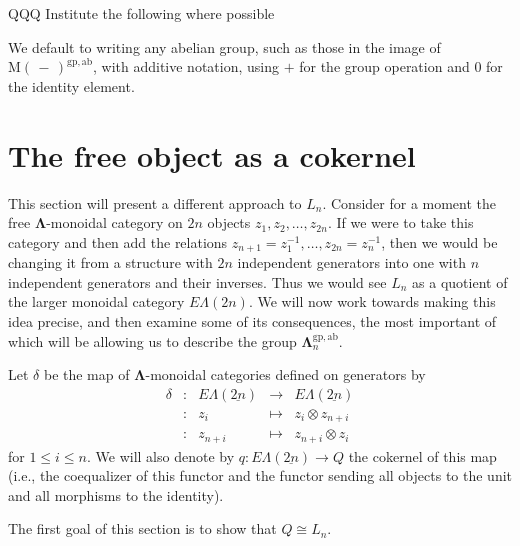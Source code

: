 \documentclass{amsbook} %
\newcommand{\ML}{\mathbf{\Lambda}}
\newcommand{\MLn}{\mathbf{\Lambda}_n}
\newcommand{\EL}{E\Lambda}
\numberwithin{section}{chapter}
\begin{document}
QQQ Institute the following where possible
\begin{conv}\label{plus}
We default to writing any abelian group, such as those in the image of $\mathrm{M}(\, - \,)^{\mathrm{gp},\mathrm{ab}}$, with additive notation, using $+$ for the group operation and 0 for the identity element.
\end{conv}



\section{The free object as a cokernel}
\label{colimalgebra} 
This section will present a different approach to $L_n$. Consider for a moment the free $\ML$-monoidal category on $2n$ objects $z_1, z_2, \ldots, z_{2n}$. If we were to take this category and then add the relations $z_{n+1} = z_1^{-1}, \ldots, z_{2n} = z_n^{-1}$, then we would be changing it from a structure with $2n$ independent generators into one with $n$ independent generators and their inverses. Thus we would see $L_n$ as a quotient of the larger monoidal category $\EL(2n)$. We will now work towards making this idea precise, and then examine some of its consequences, the most important of which will be allowing us to describe the group $\MLn^{\mathrm{gp},\mathrm{ab}}$.





\begin{Defi}\label{qdef} Let $\delta$ be the map of $\ML$-monoidal categories defined on generators by
\[ \begin{array}{rlrlll}
			\delta & \colon & \EL(\underline{2n}) & \to & \EL(\underline{2n}) \\
			& \colon & z_{i} & \mapsto & z_i \otimes z_{n+i} \\
			& \colon & z_{n+i} & \mapsto & z_{n+i} \otimes z_i			
		\end{array}
\]
for $1 \le i \le n$. We will also denote by $q \colon  \EL(\underline{2n}) \to Q$ the cokernel of this map (i.e., the coequalizer of this functor and the functor sending all objects to the unit and all morphisms to the identity).  
\end{Defi}


The first goal of this section is to show that $Q \cong L_n$.
\end{document}
